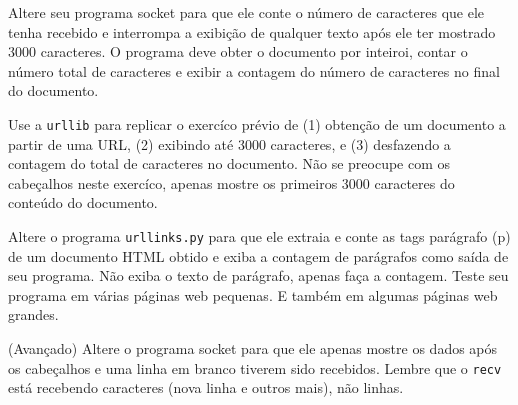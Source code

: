 \begin{ex}
Altere seu programa socket para que ele conte o número de caracteres que ele
tenha recebido e interrompa a exibição de qualquer texto após ele ter mostrado
3000 caracteres.  O programa deve obter o documento por inteiroi, contar o
número total de caracteres e exibir a contagem do número de caracteres no
final do documento.
\end{ex}

\begin{ex}
Use a {\tt urllib} para replicar o exercíco prévio de (1) obtenção de um
documento a partir de uma URL, (2) exibindo até 3000 caracteres, e (3) 
desfazendo a contagem do total de caracteres no documento.  Não se preocupe
com os cabeçalhos neste exercíco, apenas mostre os primeiros 3000 caracteres
do conteúdo do documento.
\end{ex}

\begin{ex}
Altere o programa {\tt urllinks.py} para que ele extraia e conte 
as tags parágrafo (p) de um documento HTML obtido e exiba a contagem
de parágrafos como saída de seu programa.  
Não exiba o texto de parágrafo, apenas faça a contagem.
Teste seu programa em várias páginas web pequenas. E também em algumas
páginas web grandes.
\end{ex}

\begin{ex}
(Avançado) Altere o programa socket para que ele apenas mostre os dados
após os cabeçalhos e uma linha em branco tiverem sido recebidos.  Lembre 
que o {\tt recv} está recebendo caracteres (nova linha e outros mais),
não linhas.
\end{ex}


